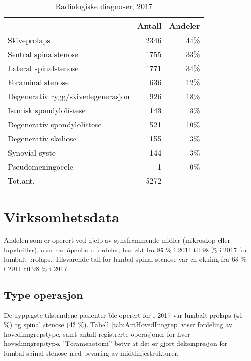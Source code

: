 \begin{table}[ht]
\centering
\begin{tabular}{lrr}
  \hline
 & Antall & Andeler \\ 
  \hline
Skiveprolaps & 2346 & 44\% \\ 
  Sentral spinalstenose & 1755 & 33\% \\ 
  Lateral spinalstenose & 1771 & 34\% \\ 
  Foraminal stenose & 636 & 12\% \\ 
  Degenerativ rygg/skivedegenerasjon & 926 & 18\% \\ 
  Istmisk spondylolistese & 143 & 3\% \\ 
  Degenerativ spondylolistese & 521 & 10\% \\ 
  Degenerativ skoliose & 155 & 3\% \\ 
  Synovial syste & 144 & 3\% \\ 
  Pseudomeningocele & 1 & 0\% \\ 
  Tot.ant. & 5272 &   \\ 
   \hline
\end{tabular}
\caption{Radiologiske diagnoser, 2017} 
\label{tab:RF}
\end{table}





\section{Virksomhetsdata}

Andelen som er operert ved hjelp av synsfremmende midler (mikroskop eller
lupebriller), som har åpenbare fordeler, har økt fra 86 \% i 2011 til 
98 \% i 2017 for lumbalt prolaps. 
Tilsvarende tall for lumbal spinal stenose var en økning fra 68 \% i 2011 til 
98 \% i 2017.



\subsection{Type operasjon}



De hyppigste tilstandene pasienter ble operert for i 2017 var lumbalt prolaps (41 \%) og spinal stenose (42 \%). Tabell \ref{tab:AntHovedInngrep} viser fordeling av hovedinngrepstype, samt antall registrerte operasjoner for hver hovedinngrepstype.
''Foramenotomi'' betyr at det er gjort dekompresjon for lumbal spinal stenose med bevaring av midtlinjestrukturer. 


